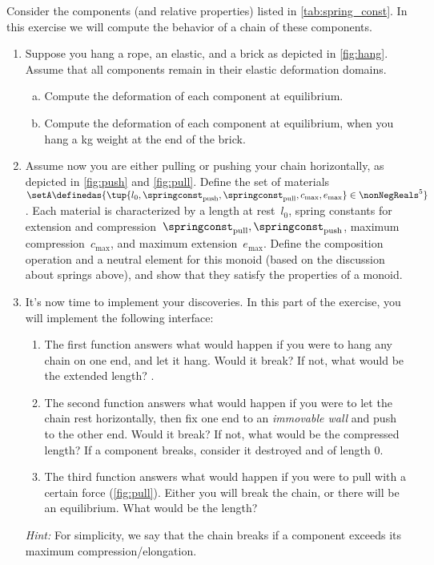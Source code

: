\begin{gradedexercise}
  Consider the components (and relative properties) listed in \cref{tab:spring_const}.
  In this exercise we will compute the behavior of a chain of these components.
  \begin{enumerate}
    \item Suppose you hang a rope, an elastic, and a brick as depicted in \cref{fig:hang}. Assume that all components remain in their elastic deformation domains.
    \begin{enumerate}[(a)]
    \item Compute the deformation of each component at equilibrium.
    \item Compute the deformation of each component at equilibrium, when you hang a \unit[1]{kg} weight at the end of the brick.
\end{enumerate}
    \item Assume now you are either pulling or pushing your chain horizontally, as depicted in \cref{fig:push} and \cref{fig:pull}.
    Define the set of materials~$\setA\definedas \{ \tup{l_0, \springconst_\mathrm{push},\springconst_\mathrm{pull}, c_\mathrm{max}, e_\mathrm{max}} \in \nonNegReals^5\}$.
Each material is characterized by a length at rest~$l_0$, spring constants for extension and compression~$\springconst_\mathrm{pull}, \springconst_\mathrm{push}$, maximum compression~$c_\mathrm{max}$, and maximum extension~$e_\mathrm{max}$.
    Define the composition operation and a neutral element for this monoid (based on the discussion about springs above), and show that they satisfy the properties of a monoid.
    \item It's now time to implement your discoveries. In this part of the exercise, you will implement the following interface:
    \begin{enumerate}
      \item The first function answers what would happen if you were to hang any chain on one end, and let it hang. Would it break? If not, what would be the extended length? .
      \item The second function answers what would happen if you were to let the chain rest horizontally, then fix one end to an \emph{immovable wall} and push to the other end. Would it break? If not, what would be the compressed length?
    If a component breaks, consider it destroyed and of length 0.
    \item The third function answers what would happen if you were to pull with a certain force (\cref{fig:pull}). Either you will break the chain, or there will be an equilibrium. What would be the length?
    \end{enumerate}
    \emph{Hint:} For simplicity, we say that the chain breaks if a component exceeds its maximum compression/elongation.
  \end{enumerate}
\end{gradedexercise}



